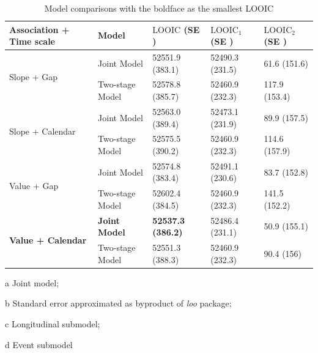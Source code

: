 \begin{table}[H]
  \small\sf\centering
   \captionsetup{justification=centering}
\caption{Model comparisons with the boldface as the smallest LOOIC}
\label{tab:chp3_comp}
 \begin{threeparttable}
\begin{tabular}{l|l|l|l|l}
\toprule
Association + Time scale & Model & $\mbox{LOOIC}$ \tnote{a} (SE\tnote{b} )  & $\mbox{LOOIC}_1$\tnote{c} (SE\tnote{b} ) & $\mbox{LOOIC}_2$\tnote{d} (SE\tnote{b} ) \\ \hline
\multirow{2}{*}{Slope + Gap} & Joint Model &  52551.9 (383.1) &	52490.3                                                 (231.5) &  61.6 (151.6) \\
                             & Two-stage Model & 52578.8 (385.7) &	52460.9 (232.3) & 117.9 (153.4)               \\ \hline
\multirow{2}{*}{Slope + Calendar} & Joint Model & 52563.0 (389.4) & 52473.1 (231.9) & 89.9 (157.5) \\
                                  & Two-stage Model & 52575.5 (390.2) & 52460.9 (232.3) & 114.6 (157.9) \\ \hline
\multirow{2}{*}{Value + Gap} & Joint Model & 52574.8 (383.4) & 52491.1 (230.6) & 83.7 (152.8)\\ 
                             & Two-stage Model & 52602.4 (384.5) & 52460.9 (232.3) & 141.5 (152.2)
                                            \\ \hline
\multirow{2}{*}{\textbf{Value + Calendar}} & \textbf{Joint Model} &                     \textbf{52537.3 (386.2)} &                                                            52486.4 (231.1) & 50.9 (155.1) \\ 
                                 & Two-stage Model & 52551.3 (388.3) &	52460.9 (232.3) & 90.4 (156)\\
\bottomrule
\end{tabular}
 \begin{tablenotes}[para]
    \footnotesize
        \item[a] Joint model; \item[b] Standard error approximated as byproduct of \emph{loo} package; \item[c] Longitudinal submodel; \item[d] Event submodel
    \end{tablenotes}
 \end{threeparttable}
\end{table}


